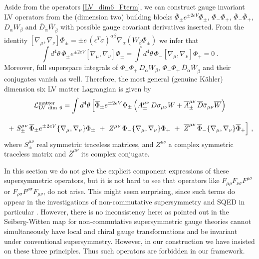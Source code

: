 \documentclass[12pt]{revtex4}
\begin{document}
Aside from the operators \eqref{LV_dim6_Fterm}, we can 
construct gauge invariant LV operators from the (dimension two)
building blocks  
$\overline{\Phi}_\pm e^{\pm 2e V} \Phi_\pm$, $\Phi_- \Phi_+$, 
$\overline{\Phi}_- \overline{\Phi}_+$, $D_\alpha W_\beta$ and
$\overline{D}_{\dot\alpha} \overline{W}_{\dot\beta}$ with possible
gauge covariant derivatives inserted. From the identity 
\(
[ \nabla_\mu, \nabla_\nu] \Phi_\pm = \pm e \, 
(\epsilon^T \sigma)^{\alpha\beta} \nabla_\alpha( W_\beta \Phi_\pm)
\)
we infer that 
\begin{equation}
\int d^4\theta\, \overline{\Phi}_\pm e^{\pm 2eV} 
[ \nabla_\mu, \nabla_\nu] \Phi_\pm  
= \int d^4\theta\, \Phi_- [ \nabla_\mu, \nabla_\nu] \Phi_+ = 0~. 
\end{equation} 
Moreover, full superspace integrals of 
$\Phi_- \Phi_+\, D_\alpha W_\beta$, 
$\Phi_- \Phi_+\, \overline{D}_{\dot\alpha} \overline{W}_{\dot\beta}$ 
and their conjugates vanish as well. Therefore, the most general
(genuine K\"ahler) dimension six LV matter Lagrangian is given by 
\begin{gather}
{\cal L}_{\rm LV\ dim\ 6}^{\rm matter}  = 
\int d^4 \theta\, \Big[ 
\overline{\Phi}_\pm e^{\pm 2eV} \Phi_\pm \, 
\Big( 
A_\pm^{\mu\nu} \, D \sigma_{\mu\nu} W + 
\overline{A}_\pm^{\mu\nu} \, \overline{D} \bar\sigma_{\mu\nu} \overline{W}
\Big) 
\nonumber \\[2ex]
~+~ S_\pm^{\mu\nu}\,  \overline{\Phi}_\pm e^{\pm 2eV} 
\lbrace \nabla_\mu, \nabla_\nu \rbrace \Phi_\pm  
~+~ Z^{\mu\nu}\,  \Phi_- \lbrace \nabla_\mu, \nabla_\nu \rbrace \Phi_+ 
~+~ \overline{Z}^{\mu\nu}\,  
\overline{\Phi}_- \lbrace \nabla_\mu, \nabla_\nu \rbrace \overline{\Phi}_+ 
 \Big]~, 
\end{gather}
where $S_\pm^{\mu\nu}$ real symmetric traceless matrices, and 
$Z^{\mu\nu}$ a complex symmetric traceless matrix and
$\overline{Z}^{\mu\nu}$ its complex conjugate. 




In this section we do not give the explicit component expressions of
these supersymmetric operators, but it is not hard to see that
operators like 
 $ F_{\mu\rho}F_{\nu\sigma}F^{\rho\sigma} $
or
  $ F_{\rho\sigma}F^{\rho\sigma}F_{\mu\nu} $, 
do not arise. This might seem surprising, since such terms do appear in
the investigations of non-commutative  supersymmetry and SQED in
particular \cite{Putz:2002ib,Mikulovic:2003sq}. However, there is no
inconsistency here: as pointed out in \cite{Mikulovic:2003sq} the
Seiberg-Witten map for non-commutative supersymmetric gauge 
theories cannot simultaneously have local and chiral gauge
transformations and be invariant under conventional supersymmetry. 
However, in our construction we have insisted on these three
principles.
Thus such operators are forbidden in our framework. 
\end{document}
